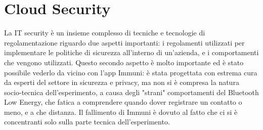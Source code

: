 \chapter{Cloud Security}
La IT security è un insieme complesso di tecniche e tecnologie di regolamentazione riguardo due aspetti importanti: i regolamenti utilizzati per implementare le politiche di sicurezza all'interno di un'azienda, e i comportamenti che vengono utilizzati. Questo secondo aspetto è molto importante ed è stato possibile vederlo da vicino con l'app Immuni: è stata progettata con estrema cura da esperti del settore in sicurezza e privacy, ma non si è compresa la natura socio-tecnica dell'esperimento, a causa degli "strani" comportamenti del Bluetooth Low Energy, che fatica a comprendere quando dover registrare un contatto o meno, e a che distanza. Il fallimento di Immuni è dovuto al fatto che ci si è concentranti solo sulla parte tecnica dell'esperimento.

\vspace{5mm}

